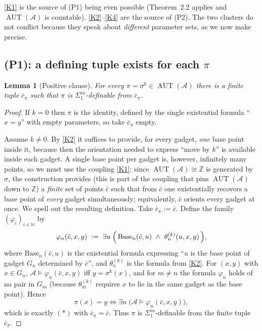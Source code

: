 \documentclass[12pt,fullpage]{article}
\newtheorem{lemma}[theorem]{Lemma}
\theoremstyle{definition}
\newcommand{\A}{\mathcal{A}}
\newcommand{\N}{\mathbb{N}}
\newcommand{\Z}{{\mathbb{Z}}}
\newcommand{\AUT}{\operatorname{AUT}}
\renewcommand{\phi}{\varphi}
\begin{document}
\ref{K1} is the source of (P1) being even possible (Theorem~2.2 applies and
$\AUT(\A)$ is countable). \ref{K2}--\ref{K4} are the source of (P2).  The two
clusters do not conflict because they speak about \emph{different} parameter
sets, as we now make precise.

\subsection*{(P1): a defining tuple exists for each $\pi$}

\begin{lemma}[Positive clause]\label{lem:P1}
For every $\pi=\sigma^k\in\AUT(\A)$ there is a finite tuple $\bar c_\pi$ such
that $\pi$ is $\Sigma^{in}_1$-definable from $\bar c_\pi$.
\end{lemma}

\begin{proof}
If $k=0$ then $\pi$ is the identity, defined by the single existential
formula ``$x=y$'' with empty parameters, so take $\bar c_\pi$ empty.

Assume $k\neq0$.  By \ref{K2} it suffices to provide, for every gadget,
\emph{one} base point inside it, because then the orientation needed to
express ``move by $k$'' is available inside each gadget.  A single base
point per gadget is, however, infinitely many points, so we must use the
coupling \ref{K1}: since $\AUT(\A)\cong\Z$ is generated by $\sigma$, the
construction provides (this is part of the coupling that pins $\AUT(\A)$ down
to $\Z$) a \emph{finite} set of points $\bar c$ such that from $\bar c$ one
existentially recovers a base point of \emph{every} gadget simultaneously;
equivalently, $\bar c$ orients every gadget at once.  We spell out the
resulting definition.  Take $\bar c_\pi:=\bar c$.  Define the family
$(\phi_i)_{i\in\N}$ by
\[
\phi_n(\bar c,x,y)\;:=\;
\exists u\;\Bigl(\,\mathrm{Base}_n(\bar c,u)\ \wedge\ \theta_n^{(k)}(u,x,y)\,\Bigr),
\]
where $\mathrm{Base}_n(\bar c,u)$ is the existential formula expressing ``$u$
is the base point of gadget $G_n$ determined by $\bar c$'', and
$\theta_n^{(k)}$ is the formula from \ref{K2}.  For $(x,y)$ with $x\in G_n$,
$\A\models\phi_n(\bar c,x,y)$ iff $y=\sigma^k(x)$, and for $m\neq n$ the
formula $\phi_n$ holds of no pair in $G_m$ (because $\theta_m^{(k)}$ requires
$x$ to lie in the same gadget as the base point).  Hence
\[
\pi(x)=y\iff\exists n\;\bigl(\A\models\phi_n(\bar c,x,y)\bigr),
\]
which is exactly $(\ast)$ with $\bar c_\pi=\bar c$.  Thus $\pi$ is
$\Sigma^{in}_1$-definable from the finite tuple $\bar c_\pi$.
\end{proof}
\end{document}
